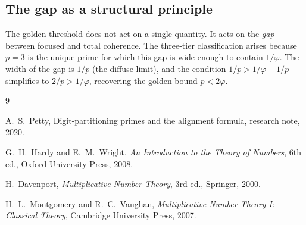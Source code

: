 \documentclass[12pt]{amsart}
\theoremstyle{definition}
\theoremstyle{remark}
\begin{document}
\subsection*{The gap as a structural principle}

The golden threshold does not act on a single quantity. It acts on
the \emph{gap} between focused and total coherence. The three-tier
classification arises because $p = 3$ is the unique prime for which
this gap is wide enough to contain $1/\varphi$. The width of the gap
is $1/p$ (the diffuse limit), and the condition $1/p > 1/\varphi -
1/p$ simplifies to $2/p > 1/\varphi$, recovering the golden bound
$p < 2\varphi$.

\begin{thebibliography}{9}

A.~S.~Petty,
Digit-partitioning primes and the alignment formula,
research note, 2020.

G.~H.~Hardy and E.~M.~Wright,
\emph{An Introduction to the Theory of Numbers},
6th ed., Oxford University Press, 2008.

H.~Davenport,
\emph{Multiplicative Number Theory},
3rd ed., Springer, 2000.

H.~L.~Montgomery and R.~C.~Vaughan,
\emph{Multiplicative Number Theory I: Classical Theory},
Cambridge University Press, 2007.

\end{thebibliography}
\end{document}
